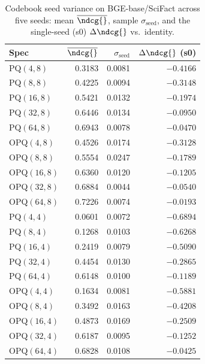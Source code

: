 \begin{table}[t]
\centering
\small
\caption{Codebook seed variance on BGE-base/SciFact across five seeds: mean $\overline{\ndcg{}}$, sample $\sigma_{\text{seed}}$, and the single-seed (s0) $\Delta\ndcg{}$ vs.\ identity.}
\label{tab:seed-variance-bge-base-scifact}
\begin{tabular}{lrrr}
\toprule
Spec & $\overline{\ndcg{}}$ & $\sigma_{\text{seed}}$ & $\Delta\ndcg{}$ (s0) \\
\midrule
PQ$(4,8)$ & 0.3183 & 0.0081 & $-0.4166$ \\
PQ$(8,8)$ & 0.4225 & 0.0094 & $-0.3148$ \\
PQ$(16,8)$ & 0.5421 & 0.0132 & $-0.1974$ \\
PQ$(32,8)$ & 0.6446 & 0.0134 & $-0.0950$ \\
PQ$(64,8)$ & 0.6943 & 0.0078 & $-0.0470$ \\
OPQ$(4,8)$ & 0.4526 & 0.0174 & $-0.3128$ \\
OPQ$(8,8)$ & 0.5554 & 0.0247 & $-0.1789$ \\
OPQ$(16,8)$ & 0.6360 & 0.0120 & $-0.1205$ \\
OPQ$(32,8)$ & 0.6884 & 0.0044 & $-0.0540$ \\
OPQ$(64,8)$ & 0.7226 & 0.0074 & $-0.0193$ \\
PQ$(4,4)$ & 0.0601 & 0.0072 & $-0.6894$ \\
PQ$(8,4)$ & 0.1268 & 0.0103 & $-0.6268$ \\
PQ$(16,4)$ & 0.2419 & 0.0079 & $-0.5090$ \\
PQ$(32,4)$ & 0.4454 & 0.0130 & $-0.2865$ \\
PQ$(64,4)$ & 0.6148 & 0.0100 & $-0.1189$ \\
OPQ$(4,4)$ & 0.1634 & 0.0081 & $-0.5881$ \\
OPQ$(8,4)$ & 0.3492 & 0.0163 & $-0.4208$ \\
OPQ$(16,4)$ & 0.4873 & 0.0169 & $-0.2509$ \\
OPQ$(32,4)$ & 0.6187 & 0.0095 & $-0.1252$ \\
OPQ$(64,4)$ & 0.6828 & 0.0108 & $-0.0425$ \\
\bottomrule
\end{tabular}
\end{table}


